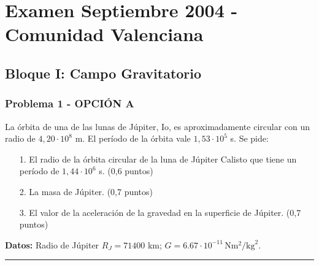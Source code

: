 \chapter{Examen Septiembre 2004 - Comunidad Valenciana}
\label{chap:2004_sep_cv}

\section{Bloque I: Campo Gravitatorio}
\label{sec:grav_2004_sep_cv}

\subsection{Problema 1 - OPCIÓN A}
\label{subsec:1A_2004_sep_cv}

\begin{cajaenunciado}
La órbita de una de las lunas de Júpiter, Io, es aproximadamente circular con un radio de $4,20\cdot10^{8}$ m. El período de la órbita vale $1,53\cdot10^{5}$ s. Se pide:
\begin{enumerate}
    \item[1.] El radio de la órbita circular de la luna de Júpiter Calisto que tiene un período de $1,44\cdot10^{6}$ s. (0,6 puntos)
    \item[2.] La masa de Júpiter. (0,7 puntos)
    \item[3.] El valor de la aceleración de la gravedad en la superficie de Júpiter. (0,7 puntos)
\end{enumerate}
\textbf{Datos:} Radio de Júpiter $R_{J}=71400$ km; $G=6.67\cdot10^{-11}\,\text{N}\text{m}^2/\text{kg}^2$.
\end{cajaenunciado}
\hrule

